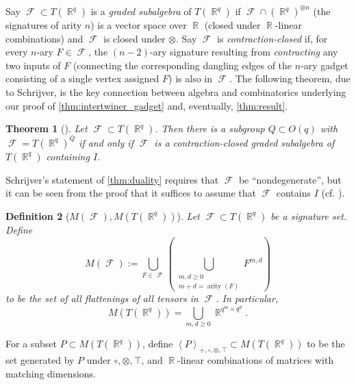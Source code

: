 \documentclass{article}
\newtheorem{theorem}{Theorem}\newtheorem{lemma}[theorem]{Lemma}\newtheorem{proposition}[theorem]{Proposition}\newtheorem{corollary}[theorem]{Corollary}\newtheorem{definition}[theorem]{Definition}\newtheorem{claim}[theorem]{Claim}\newtheorem{remark}[theorem]{Remark}\newtheorem{conjecture}[theorem]{Conjecture}
\DeclareMathOperator{\rr}{\mathbb{R}}
\DeclareMathOperator{\arity}{arity}
\DeclareMathOperator{\fc}{\mathcal{F}}
\newcommand{\tcwd}[1]{\left\langle #1 \right\rangle_{+, \circ, \otimes ,\top}}
\begin{document}
Say $\fc \subset T(\rr^q)$ is a \emph{graded subalgebra} of $T(\rr^q)$ if 
$\fc \cap (\rr^q)^{\otimes n}$ (the signatures of arity $n$) 
is a vector space over $\rr$ (closed under $\rr$-linear combinations) and
$\fc$ is closed under $\otimes$.
Say $\fc$ is \emph{contraction-closed} if, for every $n$-ary $F \in \fc$,
the $(n-2)$-ary signature resulting from \emph{contracting} any two inputs of $F$ 
(connecting the corresponding dangling edges of the $n$-ary gadget consisting of a single vertex
assigned $F$) is also in $\fc$.
The following theorem, due to Schrijver, is the key connection between
algebra and combinatorics underlying
our proof of \autoref{thm:intertwiner_gadget} and, eventually, \autoref{thm:result}.
\begin{theorem}[{\cite[{Corollary 1e}]{schrijver_tensor_2008}}]
    Let $\fc \subset T(\rr^q)$. Then there is a subgroup $Q \subset O(q)$ with $\fc = T(\rr^q)^Q$
    if and only if $\fc$ is a contraction-closed graded subalgebra of $T(\rr^q)$ containing $I$.
    \label{thm:duality}
\end{theorem}
Schrijver's statement of \autoref{thm:duality} requires that
$\fc$ be ``nondegenerate'', but it can be seen from the proof that
it suffices to assume that $\fc$ contains $I$ (cf. \cite[Theorem 4]{regts_rank_2012}).

\begin{definition}[$M(\fc),M(T(\rr^q))$]
    Let $\fc \subset T(\rr^q)$ be a signature set. Define 
    \[
        M(\fc) := \bigcup_{F \in \fc}\left(\bigcup_{\substack{m,d \geq 0 \\ m+d=\arity(F)}} 
        F^{m,d}\right)
    \]
    to be the set of all flattenings of all tensors in $\fc$. In particular,
    \[
        M(T(\rr^q)) = \bigcup_{m,d \geq 0} \rr^{q^m\times q^d}.
    \]
\end{definition}
For a subset $P \subset M(T(\rr^q))$, define $\tcwd{P} \subset M(T(\rr^q))$ to be the set generated
by $P$ under $\circ, \otimes, \top$, and $\rr$-linear combinations of matrices with matching
dimensions.
\end{document}
